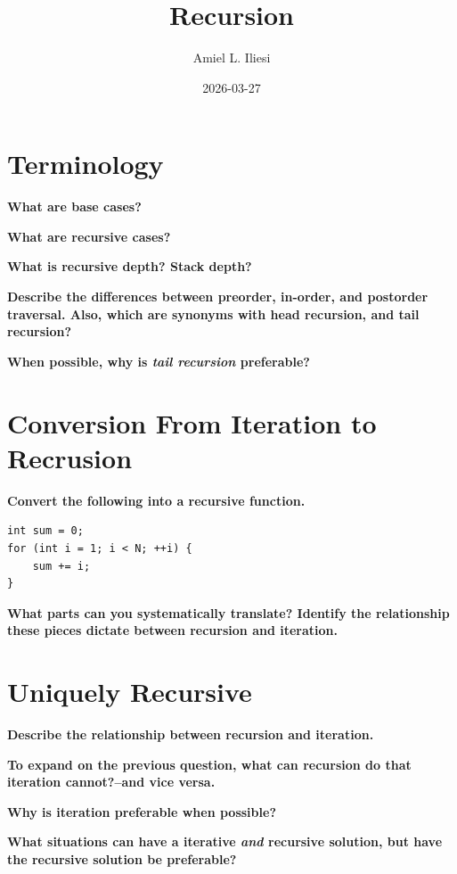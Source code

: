 \documentclass[12pt, letterpaper]{article}
\title{Recursion}
\author{Amiel L. Iliesi}
\date{2026-03-27}
\newcommand{\question}[2][4em]{\textbf{#2}\vspace{#1}\par}
\begin{document}
\maketitle

\tableofcontents

\pagebreak
\section{Terminology}

\question{What are base cases?}

\question{What are recursive cases?}

\question{What is recursive depth? Stack depth?}

\question[12em]{Describe the differences between preorder, in-order, and postorder
traversal. Also, which are synonyms with head recursion, and tail recursion?}

\question{When possible, why is \emph{tail recursion} preferable?}

\pagebreak
\section{Conversion From Iteration to Recrusion}

\question[0em]{Convert the following into a recursive function.}

\begin{verbatim}
int sum = 0;
for (int i = 1; i < N; ++i) {
    sum += i;
}
\end{verbatim}
\vspace{14em}

\question{What parts can you systematically translate? Identify the
relationship these pieces dictate between recursion and iteration.}

\pagebreak
\section{Uniquely Recursive}

\question{Describe the relationship between recursion and iteration.}

\question{To expand on the previous question, what can recursion do that
iteration cannot?--and vice versa.}

\question{Why is iteration preferable when possible?}

\question{What situations can have a iterative \textit{and} recursive solution,
but have the recursive solution be preferable?}
\end{document}
